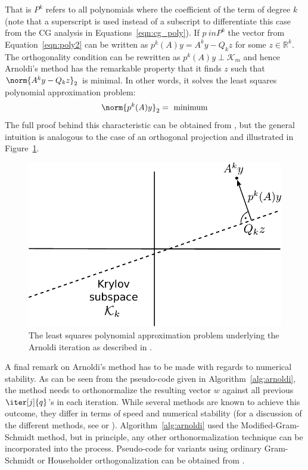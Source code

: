 \noindent  That is $P^k$ refers to all polynomials where the coefficient of the term of degree $k$ (note that a superscript is used instead of a subscript to differentiate this case from the CG analysis in Equations~\hyperref[eqn:cg_poly]{\ref{eqn:cg_poly}}). If $p \ in P^k$ the vector from Equation~\hyperref[eqn:poly2]{\ref{eqn:poly2}} can be written as $p^k(A)y=A^ky-Q_kz$ for some $z \in \mathbb{R}^k$. The orthogonality condition can be rewritten as $p^k(A)y \perp \mathcal{K}_m$ and hence Arnoldi's method has the remarkable property that it finds $z$ such that $\norm{A^ky-Q_kz}_2$ is minimal. In other words, it solves the least squares polynomial approximation problem:
\begin{equation}
\label{eqn:poly_arnoldi}
    \norm{p^k(A)y}_2 = \text{ minimum}
\end{equation}
\noindent The full proof behind this characteristic can be obtained from \cite{trefethen_numerical_1997}, but the general intuition is analogous to the case of an orthogonal projection and illustrated in Figure~\hyperref[fig:arnoldi]{\ref{fig:arnoldi}}.

\begin{figure}[h]
    \centering
    \includegraphics[width=0.6\linewidth]{chapters/3_solvers/3_2_iterative_solvers/figures/Arnoldi.pdf}
    \caption{The least squares polynomial approximation problem underlying the Arnoldi iteration as described in \cite{trefethen_numerical_1997}.}
    \label{fig:arnoldi}
\end{figure}

\noindent A final remark on Arnoldi's method has to be made with regards to numerical stability. As can be seen from the pseudo-code given in Algorithm~\hyperref[alg:arnoldi]{\ref{alg:arnoldi}}, the method needs to orthonormalize the resulting vector $w$ against all previous $\iter[j]{q}$'s in each iteration. While several methods are known to achieve this outcome, they differ in terms of speed and numerical stability (for a discussion of the different methods, see \cite{golub_matrix_2013} or \cite{trefethen_numerical_1997}). Algorithm~\hyperref[alg:arnoldi]{\ref{alg:arnoldi}} used the Modified-Gram-Schmidt method, but in principle, any other orthonormalization technique can be incorporated into the process. Pseudo-code for variants using ordinary Gram-Schmidt or Householder orthogonalization can be obtained from \cite{saad_iterative_2003}.


